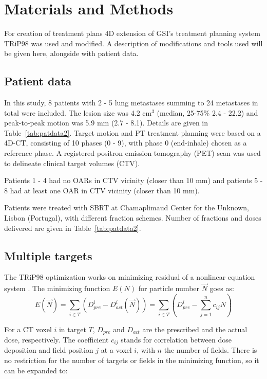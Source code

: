 \section{Materials and Methods}

For creation of treatment plans 4D extension of GSI's treatment planning system TRiP98 \cite{Kraemer2000a, Richter2013} was used and modified. A description of modifications and tools used will be given here, 
alongside with patient data.

\subsection{Patient data}


In this study, 8 patients with 2 - 5 lung metastases summing to 24 metastases in total were included. The lesion size was 4.2 cm$^3$ (median, 25-75\% 2.4 - 22.2) and peak-to-peak motion was 5.9 mm (2.7 - 8.1). 
Details are given in Table~\ref{tab:patdata2}.
Target motion and PT treatment planning were based on a 4D-CT, consisting of 10 phases (0 - 9), with phase 0 (end-inhale) chosen as a reference phase.
A registered positron emission tomography (PET) scan was used to delineate clinical target volumes (CTV). 

Patients 1 - 4 had no OARs in CTV vicinity (closer than 10 mm) and patients 5 - 8 had at least one OAR in CTV vicinity (closer than 10 mm).

Patients were treated with SBRT at Chamaplimaud Center for the Unknown, Lisbon (Portugal), with different fraction schemes. Number of fractions and doses delivered are given in Table~\ref{tab:patdata2}. 

\subsection{Multiple targets}

The TRiP98 optimization works on minimizing residual of a nonlinear equation system \cite{Kraemer2000a}. The minimizing function $E(N)$ for particle number $\vec{N}$ goes as:
\begin{equation}
\label{eq-costFunc}
 E(\vec{N}) = \sum_{i\in T} \left( D_{pre}^{i} - D_{act}^{i}(\vec{N})\right) = \sum_{i\in T} \left( D_{pre}^{i} -\sum_{j=1}^n c_{ij}N\right)
\end{equation}

For a CT voxel $i$ in target $T$, $ D_{pre}$ and $D_{act}$ are the prescribed and the actual dose, respectively. The coefficient $c_{ij}$ stands for correlation between dose deposition and field position $j$ at a voxel $i$, 
with $n$ the number of fields. There is no restriction for the number of targets or fields in the minimizing function, so it can be expanded to:

